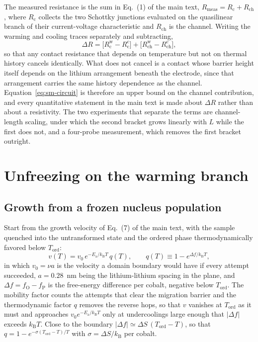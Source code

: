 \documentclass[reprint,twocolumn,prb,amsmath,amssymb,superscriptaddress,floatfix]{revtex4-2}
\newcommand{\kB}{k_{\mathrm{B}}}
\newcommand{\Ea}{E_{\mathrm{a}}}
\newcommand{\Tcol}{T_{\mathrm{ord}}}
\begin{document}
The measured resistance is the sum in Eq.~(1) of the main text,
$R_{\mathrm{meas}}=R_{\mathrm{c}}+R_{\mathrm{ch}}$, where $R_{\mathrm{c}}$ collects the two
Schottky junctions evaluated on the quasilinear branch of their current-voltage characteristic
and $R_{\mathrm{ch}}$ is the channel. Writing the warming and cooling traces separately and
subtracting,
\begin{equation}
  \Delta R = \bigl[R_{\mathrm{c}}^{\mathrm{w}}-R_{\mathrm{c}}^{\mathrm{c}}\bigr]
           + \bigl[R_{\mathrm{ch}}^{\mathrm{w}}-R_{\mathrm{ch}}^{\mathrm{c}}\bigr],
  \label{eq:sm-circuit}
\end{equation}
so that any contact resistance that depends on temperature but not on thermal history cancels
identically. What does not cancel is a contact whose barrier height itself depends on the
lithium arrangement beneath the electrode, since that arrangement carries the same history
dependence as the channel. Equation~\eqref{eq:sm-circuit} is therefore an upper bound on the
channel contribution, and every quantitative statement in the main text is made about
$\Delta R$ rather than about a resistivity. The two experiments that separate the terms are
channel-length scaling, under which the second bracket grows linearly with $L$ while the first
does not, and a four-probe measurement, which removes the first bracket outright.

\section{Unfreezing on the warming branch}
\label{sec:unfreezing}

\subsection{Growth from a frozen nucleus population}

Start from the growth velocity of Eq.~(7) of the main text, with the sample quenched into the
untransformed state and the ordered phase thermodynamically favored below $\Tcol$:
\begin{equation}
  v(T) = v_{0}\,e^{-\Ea/\kB T}\,q(T),
  \qquad
  q(T)\equiv 1-e^{\Delta f/\kB T},
  \label{eq:sm-master}
\end{equation}
in which $v_{0}=\nu a$ is the velocity a domain boundary would have if every attempt succeeded,
$a=0.28$~nm being the lithium-lithium spacing in the plane, and $\Delta f=f_{\mathrm{O}}-
f_{\mathrm{P}}$ is the free-energy difference per cobalt, negative below $\Tcol$. The mobility
factor counts the attempts that clear the migration barrier and the thermodynamic factor $q$
removes the reverse hops, so that $v$ vanishes at $\Tcol$ as it must and approaches
$v_{0}e^{-\Ea/\kB T}$ only at undercoolings large enough that $|\Delta f|$ exceeds $\kB T$.
Close to the boundary $|\Delta f|\simeq\Delta S\,(\Tcol-T)$, so that
$q=1-e^{-\sigma(\Tcol-T)/T}$ with $\sigma=\Delta S/\kB$ per cobalt.
\end{document}
